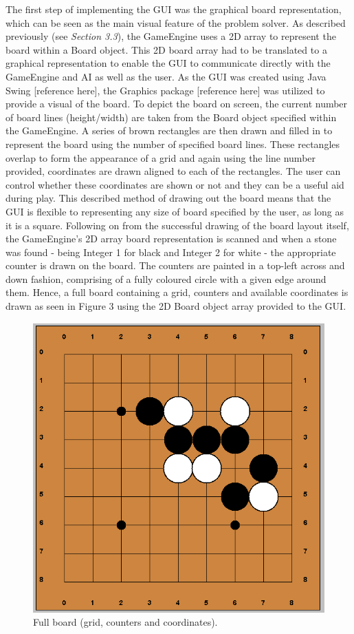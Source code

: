 \documentclass{l3proj}
\begin{document}
The first step of implementing the GUI was the graphical board representation, which can be seen as the main visual feature of the problem solver. As described previously (see \textit{Section 3.3}), the GameEngine uses a 2D array to represent the board within a Board object. This 2D board array had to be translated to a graphical representation to enable the GUI to communicate directly with the GameEngine and AI as well as the user. As the GUI was created using Java Swing [reference here], the Graphics package [reference here] was utilized to provide a visual of the board. To depict the board on screen, the current number of board lines (height/width) are taken from the Board object specified within the GameEngine. A series of brown rectangles are then drawn and filled in to represent the board using the number of specified board lines. These rectangles overlap to form the appearance of a grid and again using the line number provided, coordinates are drawn aligned to each of the rectangles. The user can control whether these coordinates are shown or not and they can be a useful aid during play. This described method of drawing out the board means that the GUI is flexible to representing any size of board specified by the user, as long as it is a square. Following on from the successful drawing of the board layout itself, the GameEngine's 2D array board representation is scanned and when a stone was found - being Integer 1 for black and Integer 2 for white - the appropriate counter is drawn on the board. The counters are painted in a top-left across and down fashion, comprising of a fully coloured circle with a given edge around them. Hence, a full board containing a grid, counters and available coordinates is drawn as seen in Figure 3 using the 2D Board object array provided to the GUI.

\begin{figure}[H]
\centering
\includegraphics[scale=0.5]{Images/GUI-3-CountersCoords.png}
\caption{Full board (grid, counters and coordinates).}
\end{figure}
\end{document}
